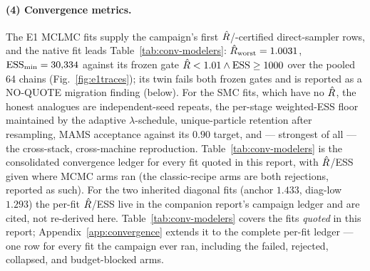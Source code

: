 \paragraph{(4) Convergence metrics.}
The E1 MCLMC fits supply the campaign's first $\hat{R}$/\ESS-certified
direct-sampler rows, and the  native fit leads
Table~\ref{tab:conv-modelers}: $\hat{R}_{\rm worst}=1.0031$,
$\textrm{ESS}_{\min}=30{,}334$ against its frozen gate
$\hat{R}<1.01 \wedge \textrm{ESS}\ge1000$ over the pooled 64 chains
(Fig.~\ref{fig:e1traces}); its  twin fails both frozen gates
and is reported as a NO-QUOTE migration finding (below). For the SMC
fits, which have no $\hat{R}$, the honest analogues are independent-seed
repeats, the per-stage weighted-ESS floor maintained by the adaptive
$\lambda$-schedule, unique-particle retention after resampling, MAMS
acceptance against its $0.90$ target, and --- strongest of all --- the
cross-stack, cross-machine reproduction. Table~\ref{tab:conv-modelers} is
the consolidated convergence ledger for every fit quoted in this report,
with $\hat{R}$/ESS given where MCMC arms ran (the classic-recipe arms are
both rejections, reported as such). For the two inherited diagonal fits (anchor $1.433$,
diag-low $1.293$) the per-fit $\hat{R}$/ESS live in the companion report's
campaign ledger \citep{cgl2026companion} and are cited, not re-derived
here. Table~\ref{tab:conv-modelers} covers the fits \emph{quoted} in this
report; Appendix~\ref{app:convergence} extends it to the complete per-fit
ledger --- one row for every fit the campaign ever ran, including the
failed, rejected, collapsed, and budget-blocked arms.

